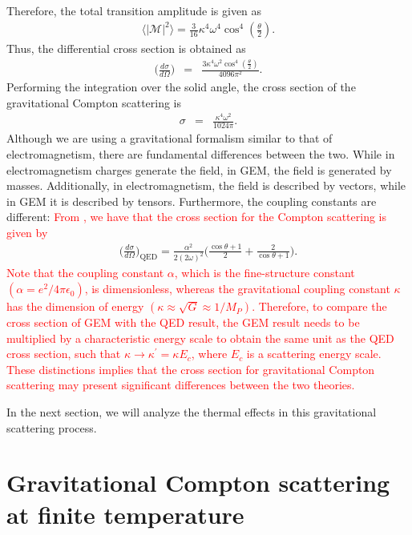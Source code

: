 \documentclass[11pt,showpacs,preprintnumbers,amsmath,amssymb,prd,nofootinbib,superscriptaddress]{revtex4-2}
\begin{document}
Therefore, the total transition amplitude is given as
\begin{eqnarray}
    \langle|\mathcal{M}|^2\rangle=\frac{3}{16} \kappa ^4 \omega ^4 \cos ^4\left(\frac{\theta }{2}\right).
\end{eqnarray}
Thus, the differential cross section is obtained as
\begin{eqnarray}
    \Big(\frac{d\sigma}{d\Omega}\Big)&=&\frac{3 \kappa ^4 \omega ^2 \cos ^4\left(\frac{\theta }{2}\right)}{4096 \pi ^2}.\label{44}
\end{eqnarray}
Performing the integration over the solid angle, the cross section of the gravitational Compton scattering is
\begin{eqnarray}
     \sigma&=&\frac{\kappa^4\omega^2}{1024\pi}.
\end{eqnarray}
Although we are using a gravitational formalism similar to that of electromagnetism, there are fundamental differences between the two. While in electromagnetism charges generate the field, in GEM, the field is generated by masses. Additionally, in electromagnetism, the field is described by vectors, while in GEM it is described by tensors. Furthermore, the coupling constants are different: \textcolor{red}{From \cite{cabral}, we have that the cross section for the Compton scattering is given by}
{\color{red}\begin{eqnarray}
		\bigg(\frac{d\sigma}{d\Omega}\bigg)_{\text{QED}}=\frac{\alpha^2}{2(2\omega)^2}\bigg(\frac{\cos\theta+1}{2}+\frac{2}{\cos\theta+1}\bigg).
\end{eqnarray}}
 \textcolor{red}{Note that the coupling constant $\alpha$, which is the fine-structure constant $(\alpha = e^2 / 4\pi\epsilon_0)$, is dimensionless, whereas the gravitational coupling constant $\kappa$ has the dimension of energy $(\kappa \approx \sqrt{G} \approx 1/M_P)$. Therefore, to compare the cross section of GEM with the QED result, the GEM result needs to be multiplied by a characteristic energy scale to obtain the same unit as the QED cross section, such that $\kappa \to \kappa^\prime = \kappa E_c$, where $E_c$ is a scattering energy scale. These distinctions implies that the cross section for gravitational Compton scattering may present significant differences between the two theories.}

In the next section, we will analyze the thermal effects in this gravitational scattering process.

\section{Gravitational Compton scattering at finite temperature} \label{IV}
\end{document}

